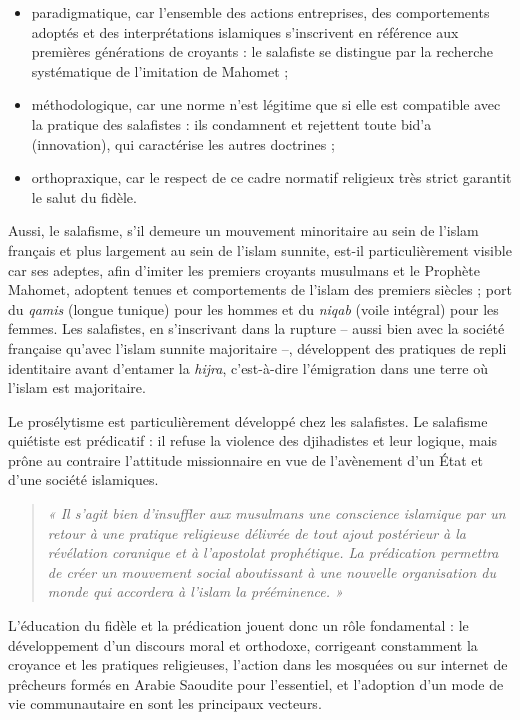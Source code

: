 \begin{itemize}
\item
  paradigmatique, car l'ensemble des actions entreprises, des
  comportements adoptés et des interprétations islamiques s'inscrivent
  en référence aux premières générations de croyants : le salafiste se
  distingue par la recherche systématique de l'imitation de Mahomet ;
\item
  méthodologique, car une norme n'est légitime que si elle est
  compatible avec la pratique des salafistes : ils condamnent et
  rejettent toute bid'a (innovation), qui caractérise les autres
  doctrines ;
\item
  
  orthopraxique, car le respect de ce cadre normatif religieux très
  strict garantit le salut du fidèle.
  
\end{itemize}


Aussi, le salafisme, s'il demeure un mouvement minoritaire au sein de
l'islam français et plus largement au sein de l'islam sunnite, est-il
particulièrement visible car ses adeptes, afin d'imiter les premiers
croyants musulmans et le Prophète Mahomet, adoptent tenues et
comportements de l'islam des premiers siècles ; port du \emph{qamis}
(longue tunique) pour les hommes et du \emph{niqab} (voile intégral)
pour les femmes. Les salafistes, en s'inscrivant dans la rupture --
aussi bien avec la société française qu'avec l'islam sunnite majoritaire
--, développent des pratiques de repli identitaire avant d'entamer la
\emph{hijra}, c'est-à-dire l'émigration dans une terre où l'islam est
majoritaire.

Le prosélytisme est particulièrement développé chez les salafistes. Le
salafisme quiétiste est prédicatif : il refuse la violence des
djihadistes et leur logique, mais prône au contraire l'attitude
missionnaire en vue de l'avènement d'un État et d'une société
islamiques.
\begin{quote}
    \emph{« Il s'agit bien d'insuffler aux musulmans une conscience
islamique par un retour à une pratique religieuse délivrée de tout ajout
postérieur à la révélation coranique et à l'apostolat prophétique. La
prédication permettra de créer un mouvement social aboutissant à une
nouvelle organisation du monde qui accordera à l'islam la
prééminence}\emph{. »}
\end{quote}
 L'éducation du fidèle et la prédication jouent
donc un rôle fondamental : le développement d'un discours moral et
orthodoxe, corrigeant constamment la croyance et les pratiques
religieuses, l'action dans les mosquées ou sur internet de prêcheurs
formés en Arabie Saoudite pour l'essentiel, et l'adoption d'un mode de
vie communautaire en sont les principaux vecteurs.

